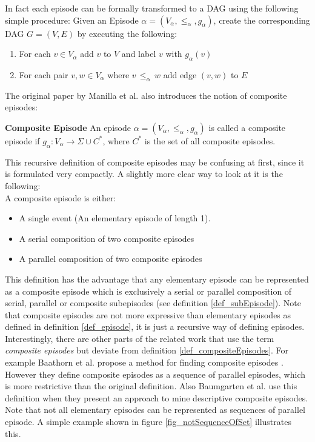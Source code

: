 In fact each episode can be formally transformed to a DAG using the following simple procedure: Given an Episode $\alpha = (V_\alpha,{\leq}_{\alpha},g_\alpha)$, create the corresponding DAG $G = (V,E)$ by executing the following:

\begin{enumerate}
	\item For each $v \in V_\alpha$ add $v$ to $V$ and label $v$ with $g_\alpha (v)$
	\item For each pair $v,w \in V_\alpha$ where $v \, {\leq}_{\alpha} \, w $ add edge $(v,w)$ to $E$
\end{enumerate}

The original paper by Manilla et al. \cite{mannila1995discovering} also introduces the notion of composite episodes:

\begin{mydef}
\label{def_compositeEpisodes}
\textbf{Composite Episode} An episode $\alpha = (V_\alpha,{\leq}_{\alpha},g_\alpha)$ is called a composite episode if $g_\alpha : V_\alpha \rightarrow \Sigma \cup C^*$, where $C^*$ is the set of all composite episodes. \cite{mannila1995discovering}
\end{mydef}

This recursive definition of composite episodes may be confusing at first, since it is formulated very compactly. A slightly more clear way to look at it is the following:\\
A composite episode is either:
\begin{itemize}
	\item A single event (An elementary episode of length 1).
	\item A serial composition of two composite episodes
	\item A parallel composition of two composite episodes
\end{itemize}

This definition has the advantage that any elementary episode can be represented as a composite episode which is exclusively a serial or parallel composition of serial, parallel or composite subepisodes (see definition \ref{def_subEpisode}). Note that composite episodes are not more expressive than elementary episodes as defined in definition \ref{def_episode}, it is just a recursive way of defining episodes. \\
Interestingly, there are other parts of the related work that use the term \textit{composite episodes} but deviate from definition \ref{def_compositeEpisodes}. For example Baathorn et al. propose a method for finding composite episodes \cite{bathoorn2007finding}. However they define composite episodes as a sequence of parallel episodes, which is more restrictive than the original definition. Also Baumgarten et al. use this definition \cite{baumgarten2003tree} when they present an approach to mine descriptive composite episodes. Note that not all elementary episodes can be represented as sequences of parallel episode. A simple example shown in figure \ref{fig_notSequenceOfSet} illustrates this.

